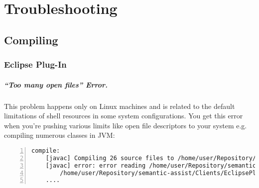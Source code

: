 
\chapter{Troubleshooting}
\section{Compiling}
\subsection{Eclipse Plug-In}
\paragraph{``Too many open files'' Error.} This problem happens only on
Linux machines and is related to the default limitations of shell
resources in some system configurations. You get this error
when you're pushing various limits like open file descriptors to your
system e.g. compiling numerous classes in JVM:


\begin{lstlisting}[language=Ant,xleftmargin=8mm,columns=flexible,numbers=left]
compile:
    [javac] Compiling 26 source files to /home/user/Repository/semantic-assist/Clients/EclipsePlugin/bin
    [javac] error: error reading /home/user/Repository/semantic-assist/Clients/EclipsePlugin/src/info/semanticsoftware/semassist/client/eclipse/Activator.java; 
        /home/user/Repository/semantic-assist/Clients/EclipsePlugin/src/info/semanticsoftware/semassist/client/eclipse/Activator.java (Too many open files)
    ....
\end{lstlisting}

